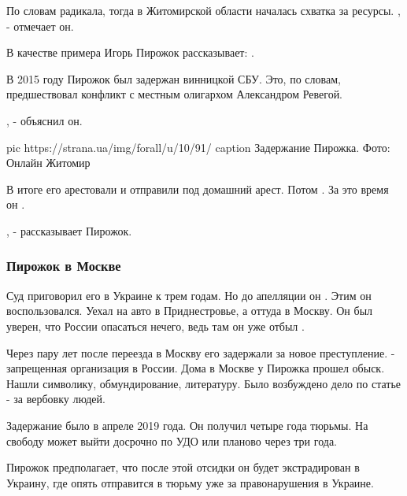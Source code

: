 По словам радикала, тогда в Житомирской области началась схватка за ресурсы.
, -
отмечает он. 

В качестве примера Игорь Пирожок рассказывает: . 

В 2015 году Пирожок был задержан винницкой СБУ. Это, по словам,
предшествовал конфликт с местным олигархом Александром Ревегой.

, - объяснил он. 

\ifcmt
pic https://strana.ua/img/forall/u/10/91/%
caption Задержание Пирожка. Фото: Онлайн Житомир
\fi

В итоге его арестовали и отправили под домашний арест. Потом . За это время он . 

, - рассказывает Пирожок. 

\subsubsection{Пирожок в Москве}

Суд приговорил его в Украине к трем годам. Но до апелляции он . Этим он воспользовался. Уехал на авто в Приднестровье, а оттуда в
Москву. Он был уверен, что России опасаться нечего, ведь там он уже отбыл
. 

Через пару лет после переезда в Москву его задержали за новое преступление.
 - запрещенная организация в России. Дома в Москве у Пирожка
прошел обыск. Нашли символику, обмундирование, литературу. Было возбуждено дело
по статье  - за
вербовку людей.

Задержание было в апреле 2019 года. Он получил четыре года тюрьмы. На
свободу может выйти досрочно по УДО или планово через три года.

Пирожок предполагает, что после этой отсидки он будет экстрадирован в
Украину, где опять отправится в тюрьму уже за правонарушения в Украине. 


